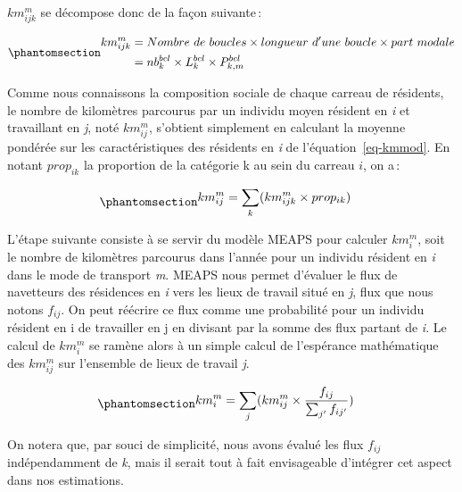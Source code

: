 \documentclass[
  9pt,
  a4paper,
  DIV=11]{scrreprt}
\begin{document}
\(km^m_{ijk}\) se décompose donc de la façon suivante\,:

\begin{equation}\phantomsection\label{eq-kmmod}{
\begin{aligned}
km^m_{ijk} & = Nombre\ de\ boucles \times longueur\ d'une\ boucle \times part\ modale
\\&= nb^{bcl}_k \times L^{bcl}_k \times P^{bcl}_{k,m} 
\end{aligned}
}\end{equation}

Comme nous connaissons la composition sociale de chaque carreau de
résidents, le nombre de kilomètres parcourus par un individu moyen
résident en \emph{i} et travaillant en \emph{j}, noté \(km^m_{ij}\),
s'obtient simplement en calculant la moyenne pondérée sur les
caractéristiques des résidents en \emph{i} de l'équation~\ref{eq-kmmod}.
En notant \(prop_{ik}\) la proportion de la catégorie k au sein du
carreau \(i\), on a\,:

\begin{equation}\phantomsection\label{eq-kmij-m}{
\begin{aligned}
km^m_{ij} &= \sum_k (km^m_{ijk} \times prop_{ik}) 
\end{aligned}
}\end{equation}

L'étape suivante consiste à se servir du modèle MEAPS pour calculer
\(km^m_i\), soit le nombre de kilomètres parcourus dans l'année pour un
individu résident en \emph{i} dans le mode de transport \emph{m}. MEAPS
nous permet d'évaluer le flux de navetteurs des résidences en \emph{i}
vers les lieux de travail situé en \emph{j}, flux que nous notons
\(f_{ij}\). On peut réécrire ce flux comme une probabilité pour un
individu résident en i de travailler en j en divisant par la somme des
flux partant de \emph{i}. Le calcul de \(km^m_i\) se ramène alors à un
simple calcul de l'espérance mathématique des \(km^m_{ij}\) sur
l'ensemble de lieux de travail \emph{j}.

\begin{equation}\phantomsection\label{eq-kmi-m}{
\begin{aligned}
km^m_{i} &= \sum_j (km^m_{ij} \times \frac{f_{ij}}{\sum_{j'} f_{ij'}}) 
\end{aligned}
}\end{equation}

On notera que, par souci de simplicité, nous avons évalué les flux
\(f_{ij}\) indépendamment de \emph{k}, mais il serait tout à fait
envisageable d'intégrer cet aspect dans nos estimations.
\end{document}
